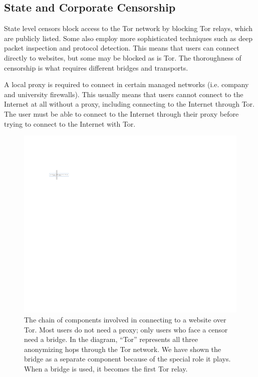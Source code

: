 \documentclass[USenglish,oneside,twocolumn]{article}
\begin{document}
\subsection{State and Corporate Censorship}
State level censors block access to the Tor network by blocking Tor relays, which are publicly listed. Some also employ more sophisticated techniques such as deep packet inspection and protocol detection. This means that users can connect directly to websites, but some may be blocked as is Tor. The thoroughness of censorship is what requires different bridges and transports. 

A local proxy is required to connect in certain managed networks (i.e. company and university firewalls). This usually means that users cannot connect to the Internet at all without a proxy, including connecting to the Internet through Tor. The user must be able to connect to the Internet through their proxy before trying to connect to the Internet with Tor. 

\begin{figure}
\centering
\includegraphics{topology.pdf}
\caption{
The chain of components involved in connecting to a website over Tor.
Most users do not need a proxy;
only users who face a censor need a bridge.
In the diagram, ``Tor'' represents all three anonymizing hops through the Tor network.
We have shown the bridge as a separate component
because of the special role it plays.
When a bridge is used, it becomes the first Tor relay.
}
\label{fig:topology}
\end{figure}
\end{document}
